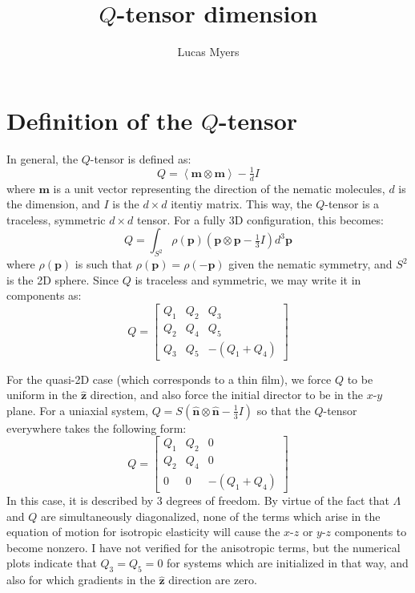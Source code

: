 \documentclass[reqno]{article}
\begin{document}
\title{$Q$-tensor dimension}
\author{Lucas Myers}
\maketitle

\section{Definition of the $Q$-tensor}
In general, the $Q$-tensor is defined as:
\begin{equation}
    Q
    =
    \left< \mathbf{m} \otimes \mathbf{m} \right>
    -
    \tfrac{1}{d} I
\end{equation}
where $\mathbf{m}$ is a unit vector representing the direction of the nematic molecules, $d$ is the dimension, and $I$ is the $d\times d$ itentiy matrix.
This way, the $Q$-tensor is a traceless, symmetric $d\times d$ tensor.
For a fully 3D configuration, this becomes:
\begin{equation}
    Q
    =
    \int_{S^2}
    \rho(\mathbf{p}) \left(\mathbf{p} \otimes \mathbf{p} - \tfrac13 I \right) d^3 \mathbf{p}
\end{equation}
where $\rho(\mathbf{p})$ is such that $\rho(\mathbf{p}) = \rho(-\mathbf{p})$ given the nematic symmetry, and $S^2$ is the 2D sphere.
Since $Q$ is traceless and symmetric, we may write it in components as:
\begin{equation}
    Q
    =
    \begin{bmatrix}
        Q_1 &Q_2 &Q_3 \\
        Q_2 &Q_4 &Q_5 \\
        Q_3 &Q_5 &-(Q_1 + Q_4)
    \end{bmatrix}
\end{equation}

For the quasi-2D case (which corresponds to a thin film), we force $Q$ to be uniform in the $\mathbf{\hat{z}}$ direction, and also force the initial director to be in the $x$-$y$ plane. 
For a uniaxial system, $Q = S \left( \mathbf{\hat{n}} \otimes \mathbf{\hat{n}} - \tfrac13 I \right)$ so that the $Q$-tensor everywhere takes the following form:
\begin{equation}
    Q
    =
    \begin{bmatrix}
        Q_1 &Q_2 &0 \\
        Q_2 &Q_4 &0 \\
        0 &0 &-(Q_1 + Q_4)
    \end{bmatrix}
\end{equation}
In this case, it is described by 3 degrees of freedom.
By virtue of the fact that $\Lambda$ and $Q$ are simultaneously diagonalized, none of the terms which arise in the equation of motion for isotropic elasticity will cause the $x$-$z$ or $y$-$z$ components to become nonzero. 
I have not verified for the anisotropic terms, but the numerical plots indicate that $Q_3 = Q_5 = 0$ for systems which are initialized in that way, and also for which gradients in the $\mathbf{\hat{z}}$ direction are zero.
\end{document}
